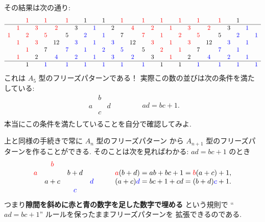 \documentclass[12pt,twoside,dvipdfm]{jarticle}
\newcommand\red{\color{red}}
\newcommand\blue{\color{blue}}
\renewcommand\r{\red}
\renewcommand\b{\blue}
\theoremstyle{definition} %
\theoremstyle{definition} %
\theoremstyle{definition} %
\numberwithin{theorem}{section}
\numberwithin{equation}{section}
\numberwithin{figure}{section}
\numberwithin{table}{section}
\begin{document}
その結果は次の通り:
\begin{equation*}
\begin{array}{cccccccccccccccccccccccccccc}
   &   &\r1&   &\r1&   &\r1&   & 1 &   & 1 &   &\r1&   &\r1&   &\r1&   &\r1&   &\r1&   &\r1&   & 1 &   &   \\ \hline
   &\r1&   &\r3&   &\r2&   & 3 &   &\b1&   & 2 &   &\r4&   &\r2&   &\r1&   &\r3&   &\r2&   & 3 &   &\b1&   \\
\r1&   &\r2&   &\r5&   & 5 &   &\b2&   &\b1&   & 7 &   &\r7&   &\r1&   &\r2&   &\r5&   & 5 &   &\b2&   &\b1\\
   &\r1&   &\r3&   &12 &   &\b3&   &\b1&   &\b3&   &12 &   &\r3&   &\r1&   &\r3&   &12 &   &\b3&   &\b1&   \\
   &   &\r1&   & 7 &   &\b7&   &\b1&   &\b2&   &\b5&   & 5 &   &\r2&   &\r1&   & 7 &   &\b7&   &\b1&   &   \\
   &\r1&   & 2 &   &\b4&   &\b2&   &\b1&   &\b3&   &\b2&   & 3 &   &\r1&   & 2 &   &\b4&   &\b2&   &\b1&   \\ \hline
   &   & 1 &   &\b1&   &\b1&   &\b1&   &\b1&   &\b1&   &\b1&   & 1 &   & 1 &   &\b1&   &\b1&   &\b1&   &\b1\\
\end{array}
\end{equation*}
これは $A_5$ 型のフリーズパターンである！ 
実際この数の並びは次の条件を満たしている:
\begin{equation*}
\begin{array}{ccc}
   & b &   \\
 a &   & d \\
   & c &   \\
\end{array}
\qquad\qquad
ad = bc+1.
\end{equation*}
本当にこの条件を満たしていることを自分で確認してみよ.

上と同様の手続きで常に $A_n$ 型のフリーズパターン
から $A_{n+1}$ 型のフリーズパターンを作ることができる.
そのことは次を見ればわかる: $ad=bc+1$ のとき
\begin{equation*}
\begin{array}{cccc}
    &\r b&    &     \\
\r a&    &b+d &     \\
    &a+c &    &\b d \\
    &    &\b c&     \\
\end{array}
\qquad
\begin{array}{ll}
{\r a}(b+d) = ab+bc+1 = {\r b}(a+c)+1, \\
(a+c){\b d} = bc+1+cd = (b+d){\b c}+1. \\
\end{array}
\end{equation*}
つまり{\bf 隙間を斜めに{\r 赤}と{\b 青}の数字を足した数字で埋める}
という規則で ``$ad=bc+1$'' ルールを保ったままフリーズパターンを
拡張できるのである.
\end{document}
